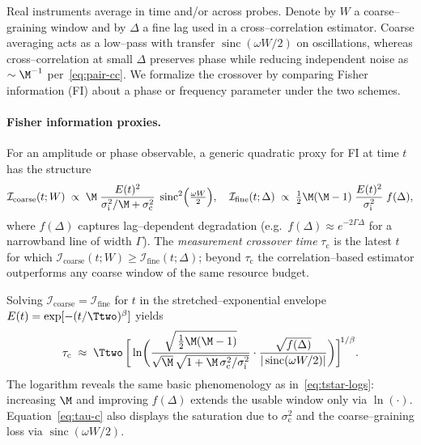 \documentclass[12pt,a4paper]{article}
\theoremstyle{definition}
\theoremstyle{remark}
\begin{document}
Real instruments average in time and/or across probes. Denote by \(W\) a coarse--graining window and by \(\Delta\) a fine lag used in a cross--correlation estimator. Coarse averaging acts as a low--pass with transfer \(\operatorname{sinc}(\omega W/2)\) on oscillations, whereas cross--correlation at small \(\Delta\) preserves phase while reducing independent noise as \(\sim\M^{-1}\) per~\eqref{eq:pair-cc}. We formalize the crossover by comparing Fisher information (FI) about a phase or frequency parameter under the two schemes.

\paragraph{Fisher information proxies.}
For an amplitude or phase observable, a generic quadratic proxy for FI at time \(t\) has the structure
\begin{equation}
\mathcal{I}_{\text{coarse}}(t;W)
\;\propto\;
\M\;\frac{E(t)^2}{\sigma_{\mathrm{i}}^2/\M+\sigma_{\mathrm{c}}^2}\;\operatorname{sinc}^2\!\Big(\tfrac{\omega W}{2}\Big),
\quad
\mathcal{I}_{\text{fine}}(t;\Delta)
\;\propto\;
\tfrac{1}{2}\M(\M-1)\;\frac{E(t)^2}{\sigma_{\mathrm{i}}^2}\;f(\Delta),
\label{eq:FI-proxies}
\end{equation}
where \(f(\Delta)\) captures lag--dependent degradation (e.g.\ \(f(\Delta)\approx e^{-2\Gamma\Delta}\) for a narrowband line of width \(\Gamma\)). The \emph{measurement crossover time} \(\tau_{\mathrm{c}}\) is the latest \(t\) for which \(\mathcal{I}_{\text{coarse}}(t;W)\ge \mathcal{I}_{\text{fine}}(t;\Delta)\); beyond \(\tau_{\mathrm{c}}\) the correlation--based estimator outperforms any coarse window of the same resource budget.

Solving \(\mathcal{I}_{\text{coarse}}=\mathcal{I}_{\text{fine}}\) for \(t\) in the stretched--exponential envelope \(E(t)=\exp[-(t/\Ttwo)^\beta]\) yields
\begin{equation}
\tau_{\mathrm{c}}
\;\approx\;
\Ttwo\,
\bigg[
\ln\!\bigg(
\frac{\sqrt{\,\tfrac{1}{2}\M(\M-1)}}
{\sqrt{\M}\,\sqrt{1+\M\,\sigma_{\mathrm{c}}^2/\sigma_{\mathrm{i}}^2}}
\cdot
\frac{\sqrt{f(\Delta)}}{|\operatorname{sinc}(\omega W/2)|}
\bigg)
\bigg]^{\!1/\beta}.
\label{eq:tau-c}
\end{equation}
The logarithm reveals the same basic phenomenology as in~\eqref{eq:tstar-logs}: increasing \(\M\) and improving \(f(\Delta)\) extends the usable window only via \(\ln(\cdot)\). Equation~\eqref{eq:tau-c} also displays the saturation due to \(\sigma_{\mathrm{c}}^2\) and the coarse--graining loss via \(\operatorname{sinc}(\omega W/2)\).
\end{document}

